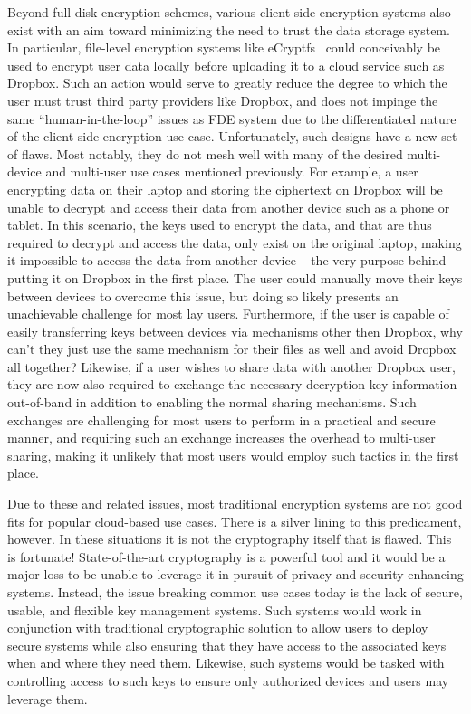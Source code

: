 Beyond full-disk encryption schemes, various client-side encryption
systems also exist with an aim toward minimizing the need to trust the
data storage system. In particular, file-level encryption systems like
eCryptfs~\cite{ecryptfs} could conceivably be used to encrypt user
data locally before uploading it to a cloud service such as
Dropbox. Such an action would serve to greatly reduce the degree to
which the user must trust third party providers like Dropbox, and does
not impinge the same ``human-in-the-loop'' issues as FDE system due to
the differentiated nature of the client-side encryption use
case. Unfortunately, such designs have a new set of flaws. Most
notably, they do not mesh well with many of the desired multi-device
and multi-user use cases mentioned previously. For example, a user
encrypting data on their laptop and storing the ciphertext on Dropbox
will be unable to decrypt and access their data from another device
such as a phone or tablet. In this scenario, the keys used to encrypt
the data, and that are thus required to decrypt and access the data,
only exist on the original laptop, making it impossible to access the
data from another device -- the very purpose behind putting it on
Dropbox in the first place. The user could manually move their keys
between devices to overcome this issue, but doing so likely presents
an unachievable challenge for most lay users. Furthermore, if the user
is capable of easily transferring keys between devices via mechanisms
other then Dropbox, why can't they just use the same mechanism for
their files as well and avoid Dropbox all together? Likewise, if a
user wishes to share data with another Dropbox user, they are now also
required to exchange the necessary decryption key information
out-of-band in addition to enabling the normal sharing
mechanisms. Such exchanges are challenging for most users to perform
in a practical and secure manner, and requiring such an exchange
increases the overhead to multi-user sharing, making it unlikely that
most users would employ such tactics in the first place.

Due to these and related issues, most traditional encryption systems
are not good fits for popular cloud-based use cases. There is a silver
lining to this predicament, however. In these situations it is not the
cryptography itself that is flawed. This is fortunate!
State-of-the-art cryptography is a powerful tool and it would be a
major loss to be unable to leverage it in pursuit of privacy and
security enhancing systems. Instead, the issue breaking common use
cases today is the lack of secure, usable, and flexible key management
systems. Such systems would work in conjunction with traditional
cryptographic solution to allow users to deploy secure systems while
also ensuring that they have access to the associated keys when and
where they need them. Likewise, such systems would be tasked with
controlling access to such keys to ensure only authorized devices and
users may leverage them.

